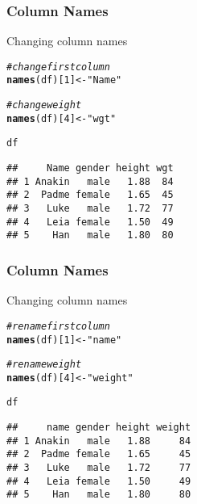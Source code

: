 \documentclass[12pt]{beamer}\usepackage[]{graphicx}\usepackage[]{color}
\makeatletter
\newcommand{\hlnum}[1]{\textcolor[rgb]{0.686,0.059,0.569}{#1}}%
\newcommand{\hlstr}[1]{\textcolor[rgb]{0.192,0.494,0.8}{#1}}%
\newcommand{\hlcom}[1]{\textcolor[rgb]{0.678,0.584,0.686}{\textit{#1}}}%
\newcommand{\hlstd}[1]{\textcolor[rgb]{0.345,0.345,0.345}{#1}}%
\newcommand{\hlkwb}[1]{\textcolor[rgb]{0.69,0.353,0.396}{#1}}%
\newcommand{\hlkwd}[1]{\textcolor[rgb]{0.737,0.353,0.396}{\textbf{#1}}}%
\newenvironment{kframe}{%
 \def\at@end@of@kframe{}%
 \ifinner\ifhmode%
  \def\at@end@of@kframe{\end{minipage}}%
  \begin{minipage}{\columnwidth}%
 \fi\fi%
 \def\FrameCommand##1{\hskip\@totalleftmargin \hskip-\fboxsep
 \colorbox{shadecolor}{##1}\hskip-\fboxsep
     \hskip-\linewidth \hskip-\@totalleftmargin \hskip\columnwidth}%
 \MakeFramed {\advance\hsize-\width
   \@totalleftmargin\z@ \linewidth\hsize
   \@setminipage}}%
 {\par\unskip\endMakeFramed%
 \at@end@of@kframe}
\newenvironment{knitrout}{}{} %
\makeatother
\begin{document}

\begin{frame}[fragile]
\frametitle{Column Names}

Changing column names
\begin{knitrout}\footnotesize
{}\color{fgcolor}\begin{kframe}
\begin{alltt}
\hlcom{# change first column}
\hlkwd{names}\hlstd{(df)[}\hlnum{1}\hlstd{]} \hlkwb{<-} \hlstr{"Name"}

\hlcom{# change weight}
\hlkwd{names}\hlstd{(df)[}\hlnum{4}\hlstd{]} \hlkwb{<-} \hlstr{"wgt"}

\hlstd{df}
\end{alltt}
\begin{verbatim}
##     Name gender height wgt
## 1 Anakin   male   1.88  84
## 2  Padme female   1.65  45
## 3   Luke   male   1.72  77
## 4   Leia female   1.50  49
## 5    Han   male   1.80  80
\end{verbatim}
\end{kframe}
\end{knitrout}

\end{frame}


\begin{frame}[fragile]
\frametitle{Column Names}

Changing column names
\begin{knitrout}\footnotesize
{}\color{fgcolor}\begin{kframe}
\begin{alltt}
\hlcom{# rename first column}
\hlkwd{names}\hlstd{(df)[}\hlnum{1}\hlstd{]} \hlkwb{<-} \hlstr{"name"}

\hlcom{# rename weight}
\hlkwd{names}\hlstd{(df)[}\hlnum{4}\hlstd{]} \hlkwb{<-} \hlstr{"weight"}

\hlstd{df}
\end{alltt}
\begin{verbatim}
##     name gender height weight
## 1 Anakin   male   1.88     84
## 2  Padme female   1.65     45
## 3   Luke   male   1.72     77
## 4   Leia female   1.50     49
## 5    Han   male   1.80     80
\end{verbatim}
\end{kframe}
\end{knitrout}

\end{frame}
\end{document}
